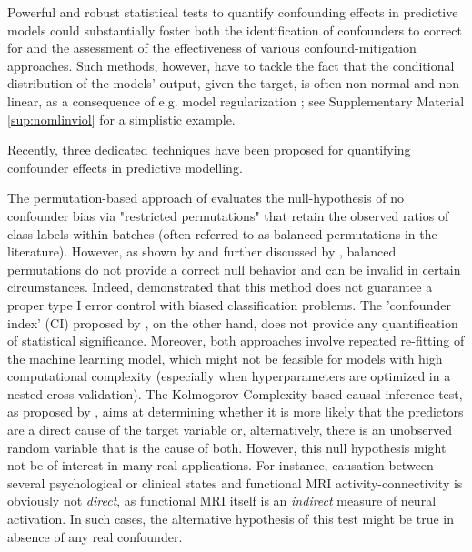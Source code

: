 \documentclass{article}
\begin{document}
Powerful and robust statistical tests to quantify confounding effects in predictive models could substantially foster both the identification of confounders to correct for and the assessment of the effectiveness of various confound-mitigation approaches. Such methods, however, have to tackle the fact that the conditional distribution of the models' output, given the target, is often non-normal and non-linear, as a consequence of e.g. model regularization \citep{garcia2009study, kristensen2017whole}; see Supplementary Material \ref{sup:nomlinviol} for a simplistic example.

Recently, three dedicated techniques \citep{chaibub2019permutation, ferrari2020measuring, wachinger2021detect} have been proposed for quantifying confounder effects in predictive modelling.

The permutation-based approach of \cite{chaibub2019permutation} evaluates the null-hypothesis of no confounder bias via "restricted permutations" that retain the observed ratios of class labels within batches (often referred to as balanced permutations in the literature). However, as shown by \cite{southworth2009properties} and further discussed by \cite{hemerik2018exact}, balanced permutations do not provide a correct null behavior and can be invalid in certain circumstances. Indeed, \cite{ferrari2020measuring} demonstrated that this method does not guarantee a proper type I error control with biased classification problems.
The 'confounder index' (CI) proposed by \cite{ferrari2020measuring}, on the other hand, does not provide any quantification of statistical significance.
Moreover, both approaches involve repeated re-fitting of the machine learning model, which might not be feasible for models with high computational complexity (especially when hyperparameters are optimized in a nested cross-validation).
The Kolmogorov Complexity-based causal inference test, as proposed by \cite{wachinger2021detect}, aims at determining whether it is more likely that the predictors are a direct cause of the target variable or, alternatively, there is an unobserved random variable that is the cause of both. However, this null hypothesis might not be of interest in many real applications. For instance, causation between several psychological or clinical states and functional MRI activity-connectivity is obviously not \emph{direct}, as functional MRI itself is an \emph{indirect} measure of neural activation. In such cases, the alternative hypothesis of this test might be true in absence of any real confounder.
\end{document}
